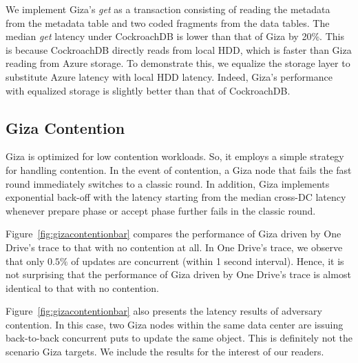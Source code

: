 We implement Giza's {\em get} as a transaction consisting of reading the
metadata from the metadata table and two coded fragments from the data tables.
The median {\em get} latency under CockroachDB is lower than that of Giza by
20\%. This is because CockroachDB directly reads from local HDD,
which is faster than Giza reading from Azure storage. To demonstrate this, we
equalize the storage layer to substitute Azure latency with local HDD latency.
Indeed, Giza's performance with equalized storage is slightly better than that
of CockroachDB. 

%

\subsection{Giza Contention}

Giza is optimized for low contention workloads. So, it employs a simple strategy for handling contention. In the event of contention, a Giza node that fails the fast round immediately switches to a classic round. In addition, Giza implements exponential back-off with the latency starting from the median cross-DC latency whenever prepare phase or accept phase further fails in the classic round.

Figure~\ref{fig:gizacontentionbar} compares the performance of Giza driven by One Drive's trace to that with no contention at all. In One Drive's trace, we observe that only $0.5\%$ of updates are concurrent (within 1 second interval). Hence, it is not surprising that the performance of Giza driven by One Drive's trace is almost identical to that with no contention.

Figure~\ref{fig:gizacontentionbar} also presents the latency results of adversary contention. In this case, two Giza nodes within the same data center are issuing back-to-back concurrent puts to update the same object. This is definitely not the scenario Giza targets. We include the results for the interest of our readers.


